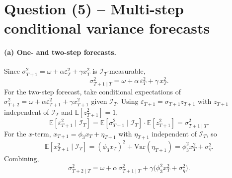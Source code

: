 \documentclass[12pt]{article}
\newcommand{\E}{\mathbb{E}}
\newcommand{\Var}{\mathrm{Var}}
\newcommand{\Info}{\mathcal{I}}
\begin{document}
\section*{Question (5) -- Multi-step conditional variance forecasts}

\paragraph{(a) One- and two-step forecasts.} Since $\sigma_{T+1}^2=\omega+\alpha\varepsilon_T^2+\gamma x_T^2$ is $\Info_T$-measurable,
\begin{equation}
\sigma_{T+1\mid T}^2 = \omega+\alpha\,\varepsilon_T^2+\gamma\,x_T^2.\label{eq:f1}
\end{equation}
For the two-step forecast, take conditional expectations of $\sigma_{T+2}^2=\omega+\alpha\varepsilon_{T+1}^2+\gamma x_{T+1}^2$ given $\Info_T$. Using $\varepsilon_{T+1}=\sigma_{T+1}z_{T+1}$ with $z_{T+1}$ independent of $\Info_T$ and $\E[z_{T+1}^2]=1$,
\begin{equation*}
\E[\varepsilon_{T+1}^2\mid\Info_T]
= \E[\sigma_{T+1}^2\mid\Info_T]\cdot\E[z_{T+1}^2]
= \sigma_{T+1\mid T}^2.
\end{equation*}
For the $x$-term, $x_{T+1}=\phi_3 x_T+\eta_{T+1}$ with $\eta_{T+1}$ independent of $\Info_T$, so
\begin{equation*}
\E[x_{T+1}^2\mid\Info_T] = (\phi_3 x_T)^2 + \Var(\eta_{T+1}) = \phi_3^2 x_T^2 + \sigma_\eta^2.
\end{equation*}
Combining,
\begin{equation}
\sigma_{T+2\mid T}^2
= \omega + \alpha\,\sigma_{T+1\mid T}^2 + \gamma\big(\phi_3^2 x_T^2 + \sigma_\eta^2\big).\label{eq:f2}
\end{equation}
\end{document}
